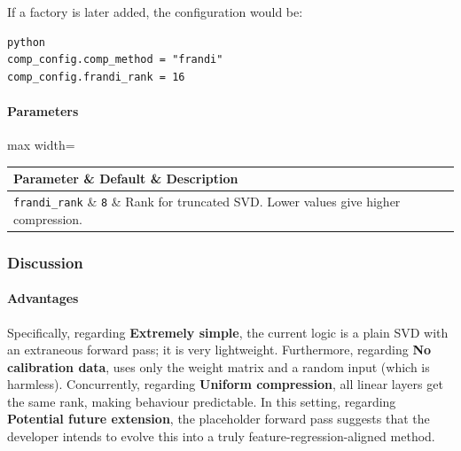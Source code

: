 If a factory is later added, the configuration would be:

\vspace{0.5em}
\begin{mdframed}[backgroundcolor=codebg, linecolor=codeframe, linewidth=1pt, roundcorner=4pt, innerleftmargin=2pt, innerrightmargin=5pt, innertopmargin=5pt, innerbottommargin=5pt]
\begin{lstlisting}
python
comp_config.comp_method = "frandi"
comp_config.frandi_rank = 16
\end{lstlisting}
\end{mdframed}
\vspace{0.5em}

\paragraph{Parameters}

\begin{center}
\begin{adjustbox}{max width=\columnwidth}
\renewcommand{\arraystretch}{1.2}
\begin{tabular}{lll}
\toprule
Parameter \& Default \& Description \\
\midrule
\texttt{frandi\_rank} \& \texttt{8} \& Rank for truncated SVD. Lower values give higher compression. \\

\bottomrule
\end{tabular}
\end{adjustbox}
\end{center}

\subsubsection*{Discussion}

\paragraph{Advantages}

Specifically, regarding \textbf{Extremely simple}, the current logic is a plain SVD with an extraneous forward pass; it is very lightweight. Furthermore, regarding \textbf{No calibration data}, uses only the weight matrix and a random input (which is harmless). Concurrently, regarding \textbf{Uniform compression}, all linear layers get the same rank, making behaviour predictable. In this setting, regarding \textbf{Potential future extension}, the placeholder forward pass suggests that the developer intends to evolve this into a truly feature-regression-aligned method.


